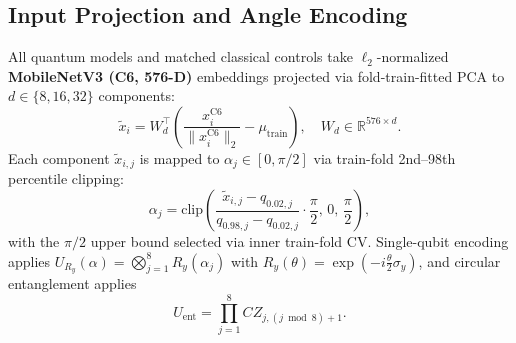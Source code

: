 \documentclass[conference]{IEEEtran}
\begin{document}
\begin{table}[!t]
\caption{Classical Candidate Representations}
\label{tab:candidate_definitions}
\centering
{}
\end{table}

\subsection{Input Projection and Angle Encoding}
All quantum models and matched classical controls take $\ell_2$-normalized \textbf{MobileNetV3 (C6, 576-D)} embeddings projected via fold-train-fitted PCA to $d \in \{8, 16, 32\}$ components:
\begin{equation}
\tilde{x}_i = W_d^\top \left(\frac{x_i^{\text{C6}}}{\|x_i^{\text{C6}}\|_2} - \mu_{\text{train}}\right), \quad W_d \in \mathbb{R}^{576 \times d}.
\end{equation}
Each component $\tilde{x}_{i,j}$ is mapped to $\alpha_j \in [0, \pi/2]$ via train-fold 2nd--98th percentile clipping:
\begin{equation}
\alpha_j = \text{clip}\left( \frac{\tilde{x}_{i,j} - q_{0.02, j}}{q_{0.98, j} - q_{0.02, j}} \cdot \frac{\pi}{2}, \, 0, \, \frac{\pi}{2} \right),
\end{equation}
with the $\pi/2$ upper bound selected via inner train-fold CV. Single-qubit encoding applies $U_{R_y}(\alpha) = \bigotimes_{j=1}^{8} R_y(\alpha_j)$ with $R_y(\theta) = \exp(-i\frac{\theta}{2}\sigma_y)$, and circular entanglement applies
\begin{equation}
U_{\text{ent}} = \prod_{j=1}^{8} CZ_{j, (j \bmod 8) + 1}.
\end{equation}
\end{document}
